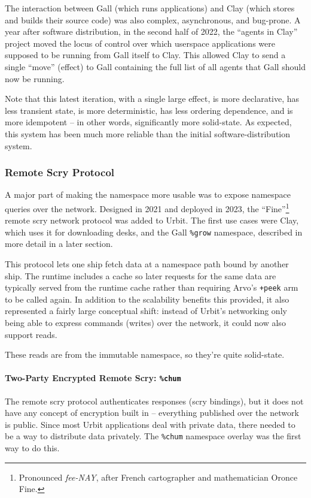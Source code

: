 \documentclass[twoside]{article}
\begin{document}
The interaction between Gall (which runs applications) and Clay (which stores and builds their source code) was also complex, asynchronous, and bug-prone.  A year after software distribution, in the second half of 2022, the ``agents in Clay'' project moved the locus of control over which userspace applications were supposed to be running from Gall itself to Clay.  This allowed Clay to send a single ``move'' (effect) to Gall containing the full list of all agents that Gall should now be running.

Note that this latest iteration, with a single large effect, is more declarative, has less transient state, is more deterministic, has less ordering dependence, and is more idempotent – in other words, significantly more solid-state.  As expected, this system has been much more reliable than the initial software-distribution system.

\subsubsection{Remote Scry Protocol}

A major part of making the namespace more usable was to expose namespace queries over the network.  Designed in 2021 and deployed in 2023, the ``Fine''\footnote{Pronounced \emph{fee-NAY}, after French cartographer and mathematician Oronce Fine.} remote scry network protocol was added to Urbit.  The first use cases were Clay, which uses it for downloading desks, and the Gall \lstinline[style=inlinecode]{%grow} namespace, described in more detail in a later section.

This protocol lets one ship fetch data at a namespace path bound by another ship.  The runtime includes a cache so later requests for the same data are typically served from the runtime cache rather than requiring Arvo's \lstinline[style=inlinecode]{+peek} arm to be called again.  In addition to the scalability benefits this provided, it also represented a fairly large conceptual shift: instead of Urbit's networking only being able to express commands (writes) over the network, it could now also support reads.

These reads are from the immutable namespace, so they're quite solid-state.

\paragraph{Two-Party Encrypted Remote Scry: \texttt{\%chum}}  The remote scry protocol authenticates responses (scry bindings), but it does not have any concept of encryption built in – everything published over the network is public.  Since most Urbit applications deal with private data, there needed to be a way to distribute data privately.  The \lstinline[style=inlinecode]{%chum} namespace overlay was the first way to do this.
\end{document}
